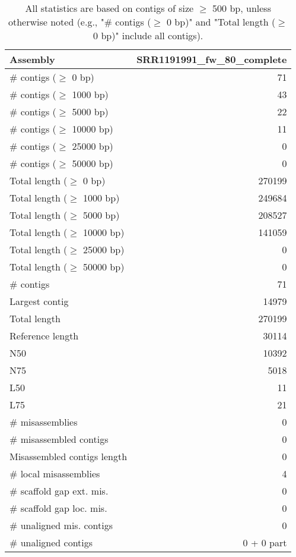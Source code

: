 \documentclass[12pt,a4paper]{article}
\begin{document}
\begin{table}[ht]
\begin{center}
\caption{All statistics are based on contigs of size $\geq$ 500 bp, unless otherwise noted (e.g., "\# contigs ($\geq$ 0 bp)" and "Total length ($\geq$ 0 bp)" include all contigs).}
\begin{tabular}{|l*{1}{|r}|}
\hline
Assembly & SRR1191991\_fw\_80\_complete \\ \hline
\# contigs ($\geq$ 0 bp) & 71 \\ \hline
\# contigs ($\geq$ 1000 bp) & 43 \\ \hline
\# contigs ($\geq$ 5000 bp) & 22 \\ \hline
\# contigs ($\geq$ 10000 bp) & 11 \\ \hline
\# contigs ($\geq$ 25000 bp) & 0 \\ \hline
\# contigs ($\geq$ 50000 bp) & 0 \\ \hline
Total length ($\geq$ 0 bp) & 270199 \\ \hline
Total length ($\geq$ 1000 bp) & 249684 \\ \hline
Total length ($\geq$ 5000 bp) & 208527 \\ \hline
Total length ($\geq$ 10000 bp) & 141059 \\ \hline
Total length ($\geq$ 25000 bp) & 0 \\ \hline
Total length ($\geq$ 50000 bp) & 0 \\ \hline
\# contigs & 71 \\ \hline
Largest contig & 14979 \\ \hline
Total length & 270199 \\ \hline
Reference length & 30114 \\ \hline
N50 & 10392 \\ \hline
N75 & 5018 \\ \hline
L50 & 11 \\ \hline
L75 & 21 \\ \hline
\# misassemblies & 0 \\ \hline
\# misassembled contigs & 0 \\ \hline
Misassembled contigs length & 0 \\ \hline
\# local misassemblies & 4 \\ \hline
\# scaffold gap ext. mis. & 0 \\ \hline
\# scaffold gap loc. mis. & 0 \\ \hline
\# unaligned mis. contigs & 0 \\ \hline
\# unaligned contigs & 0 + 0 part \\ \hline

\end{tabular}
\end{center}
\end{table}
\end{document}

